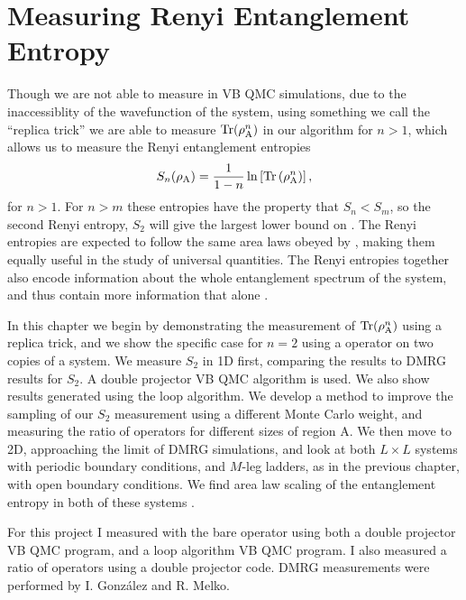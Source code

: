 \chapter{Measuring Renyi Entanglement Entropy}
\label{chap:renyi}

Though we are not able to measure \vn in VB QMC simulations, due to the inaccessiblity of the wavefunction of the system, using something we call the ``replica trick'' \cite{dad} we are able to measure ${\rm Tr}(\rho_{\rm A}^n)$ in our algorithm for $n>1$, which allows us to measure the Renyi entanglement entropies 
\begin{equation} \label{renyi2}
 	S_n(\rho_{\rm A}) = \frac{1}{1-n}\ln\left[{\rm Tr}\left( \rho_{\rm A}^n \right) \right],
\end{equation}
for $n>1$.  For $n>m$ these entropies have the property that $S_n<S_m$, so the second Renyi entropy, $S_2$ will give the largest lower bound on \vN.
The Renyi entropies are expected to follow the same area laws obeyed by \vn \cite{Bbob}, making them equally useful in the study of universal quantities.
The Renyi entropies together also encode information about the whole entanglement spectrum of the system, and thus contain more information that \vn alone \cite{Bbob}.

In this chapter we begin by demonstrating the measurement of ${\rm Tr}(\rho_{\rm A}^n)$ using a replica trick, and we show the specific case for $n=2$ using a \sw operator on two copies of a system.
We measure $S_2$ in 1D first, comparing the results to DMRG results for $S_2$.  
A double projector VB QMC algorithm is used. 
We also show results generated using the loop algorithm.
We develop a method to improve the sampling of our $S_2$ measurement using a different Monte Carlo weight, and measuring the ratio of \swa operators for different sizes of region A.
We then move to 2D, approaching the limit of DMRG simulations, and look at both $L\times L$ systems with periodic boundary conditions, and $M$-leg ladders, as in the previous chapter, with open boundary conditions.  
We find area law scaling of the entanglement entropy in both of these systems \cite{PRL2}.

For this project I measured \re with the bare \swa operator using both a double projector VB QMC program, and a loop algorithm VB QMC program.  I also measured a ratio of \swa operators using a double projector code.  DMRG measurements were performed by I. Gonz\'alez and R. Melko.

